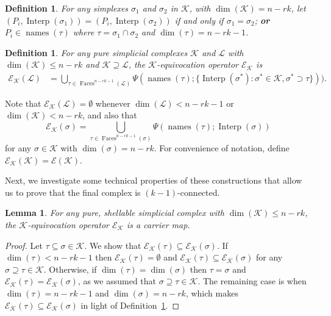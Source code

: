 \documentclass[11pt]{article}
\newcommand{\cE}{\ensuremath{\mathcal{E}}}
\newcommand{\cK}{\ensuremath{\mathcal{K}}}
\newcommand{\cL}{\ensuremath{\mathcal{L}}}
\DeclareMathOperator{\Faces}{Faces}
\DeclareMathOperator{\names}{names}\DeclareMathOperator{\name}{name}\DeclareMathOperator{\sgn}{sgn}
\newtheorem{definition}[theorem]{Definition}
\newtheorem{lemma}[theorem]{Lemma}
\newcommand{\set}[1]{\{#1\}}
\DeclareMathOperator{\interp}{Interp}
\begin{document}
\begin{definition}
\label{definition-interp}
For any simplexes $\sigma_1$ and $\sigma_2$ in $\cK$,
with $\dim(\cK) = n - rk$,
let $(P_i, \interp(\sigma_1)) = (P_i, \interp(\sigma_2))$ if and only if
$\sigma_1 = \sigma_2$; \textbf{or}
$P_i \in \names(\tau)$ where $\tau = \sigma_1 \cap \sigma_2$ and $\dim(\tau) = n -rk - 1$.
\end{definition}

\begin{definition}
\label{definition-roundop-equivocate}
For any pure simplicial complexes $\cK$ and $\cL$
with $\dim(\cK) \le n - rk$ and $\cK \supseteq \cL$,
the $\cK$-equivocation operator $\cE_{\cK}$ is
\begin{align}
\label{eq-roundop-equivocate}
\cE_{\cK}(\cL) & = \bigcup_{\tau \in \Faces^{n-rk-1}(\cL)}
		             \Psi(\names(\tau); \set{\interp(\sigma^*): \sigma^* \in \cK, \sigma^* \supset \tau})) \mathrm{.}
\end{align}
\end{definition}
Note that $\cE_{\cK}(\cL) = \emptyset$ whenever $\dim(\cL) < n -rk - 1$ or $\dim(\cK) < n -rk$,
and also that
\begin{equation}
\cE_{\cK}(\sigma) = \bigcup_{\tau \in \Faces^{n-rk-1}(\sigma)} \Psi(\names(\tau); \interp(\sigma))
\end{equation}
for any $\sigma \in \cK$ with $\dim(\sigma) = n -rk$.
For convenience of notation,
define $\cE_{\cK}(\cK) = \cE(\cK)$.

Next, we investigate some technical properties of these constructions
that allow us to prove that the final complex is $(k-1)$-connected.
\begin{lemma}
\label{lemma-eqv:carrier}
For any pure, shellable simplicial complex with $\dim(\cK) \le n - rk$,
the $\cK$-equivocation operator $\cE_{\cK}$ is a carrier map.
\end{lemma}
\begin{proof}
Let $\tau \subseteq \sigma \in \cK$.
We show that $\cE_{\cK}(\tau) \subseteq \cE_{\cK}(\sigma)$.
If $\dim(\tau) < n - rk - 1$ then $\cE_{\cK}(\tau) = \emptyset$
and $\cE_{\cK}(\tau) \subseteq \cE_{\cK}(\sigma)$ for any $\sigma \supseteq \tau \in \cK$.
Otherwise,
if $\dim(\tau) = \dim(\sigma)$ then $\tau = \sigma$ and $\cE_{\cK}(\tau) = \cE_{\cK}(\sigma)$,
as we assumed that $\sigma \supseteq \tau \in \cK$.
The remaining case is when
$\dim(\tau) = n - rk - 1$ and $\dim(\sigma) = n - rk$,
which makes $\cE_{\cK}(\tau) \subseteq \cE_{\cK}(\sigma)$
in light of Definition~\ref{definition-roundop-equivocate}.
\end{proof}
\end{document}

